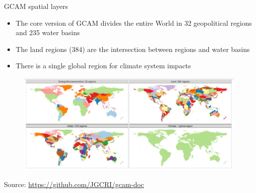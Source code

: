 \begin{frame}{GCAM spatial layers}
    \begin{itemize}
        \item The core version of GCAM divides the entire World in 32 geopolitical regions and 235 water basins
        \item The land regions (384) are the intersection between regions and water basins
        \item There is a single global region for climate system impacts
    \end{itemize}
    \begin{figure}
        \centering
        \includegraphics[width = 0.8\linewidth]{extraFigs/GCAM_spatial_layers.jpg}
    \end{figure}
    \vfill\hfill \tiny{Source: \url{https://github.com/JGCRI/gcam-doc}}
\end{frame}

